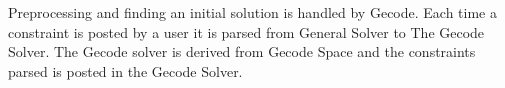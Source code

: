 Preprocessing and finding an initial solution is handled by Gecode. Each time a constraint is posted by a user it is 
parsed from General Solver to The Gecode Solver. The Gecode solver is derived from Gecode Space  and the constraints parsed is posted in the Gecode Solver. 
